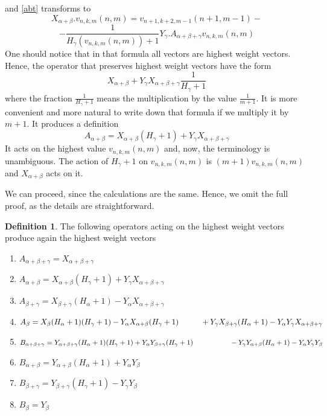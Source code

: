 \documentclass[twoside,a4paper,12pt]{article}
\theoremstyle{definition}
\newtheorem{definition}{Definition}
\begin{document}
and \eqref{abt} transforms to
\[ X_{\alpha+\beta}.v_{n,k,m}(n,m)=v_{n+1,k+2,m-1}(n+1,m-1)- \]
\[ -\frac1{H_\gamma(v_{n,k,m}(n,m))+1}Y_\gamma.A_{\alpha+\beta+\gamma}
	v_{n,k,m}(n,m) \]
One should notice that in that formula all vectors are highest weight vectors.
Hence, the operator that preserves highest weight vectors have the form
\[ X_{\alpha+\beta}+Y_\gamma X_{\alpha+\beta+\gamma}\frac1{H_\gamma+1} \]
where the fraction $\frac1{H_\gamma+1}$ means the multiplication by the value
$\frac1{m+1}$. It is more convenient and more natural to write down that
formula if we multiply it by $m+1$. It produces a definition
\begin{equation*}
	A_{\alpha+\beta}=
	X_{\alpha+\beta}(H_\gamma+1)+Y_\gamma X_{\alpha+\beta+\gamma}
\end{equation*}
It acts on the highest value $v_{n,k,m}(n,m)$ and, now, the terminology is
unambiguous. The action of $H_\gamma+1$ on $v_{n,k,m}(n,m)$ is
$(m+1)v_{n,k,m}(n,m)$ and $X_{\alpha+\beta}$ acts on it.

We can proceed, since the calculations are the same. Hence, we omit the full
proof, as the details are straightforward.

\begin{definition}\label{def1}
	The following operators acting on the highest weight vectors produce
	again the highest weight vectors
	\begin{enumerate}
		\item $A_{\alpha+\beta+\gamma}=X_{\alpha+\beta+\gamma}$
		\item $A_{\alpha+\beta}=X_{\alpha+\beta}(H_\gamma+1)
			+Y_\gamma X_{\alpha+\beta+\gamma}$
		\item $A_{\beta+\gamma}=X_{\beta+\gamma}(H_\alpha+1)
			-Y_\alpha X_{\alpha+\beta+\gamma}$
		\item $A_{\beta}=X_{\beta}(H_\alpha+1)(H_\gamma+1)
			-Y_\alpha X_{\alpha+\beta}(H_\gamma+1)\\
			\hspace*{10mm}+Y_\gamma X_{\beta+\gamma}(H_\alpha+1)
			-Y_\alpha Y_\gamma X_{\alpha+\beta+\gamma}$
		\item $B_{\alpha+\beta+\gamma}=Y_{\alpha+\beta+\gamma}(H_\alpha+1)
			(H_\gamma+1)+Y_\alpha Y_{\beta+\gamma}(H_\gamma+1)\\
			\hspace*{18mm}-Y_\gamma Y_{\alpha+\beta}(H_\alpha+1)
			-Y_\alpha Y_\gamma Y_\beta$
		\item $B_{\alpha+\beta}=Y_{\alpha+\beta}(H_\alpha+1)+Y_\alpha Y_\beta$
		\item $B_{\beta+\gamma}=Y_{\beta+\gamma}(H_\gamma+1)-Y_\gamma Y_\beta$
		\item $B_\beta=Y_\beta$
	\end{enumerate}
\end{definition}
\end{document}
